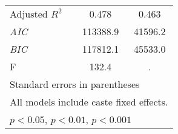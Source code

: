 \begin{table}[htbp]
\begin{tabular}{l*{2}{c}}
Adjusted \(R^{2}\)&    0.478         &    0.463         \\
\textit{AIC}    & 113388.9         &  41596.2         \\
\textit{BIC}    & 117812.1         &  45533.0         \\
F               &    132.4         &        .         \\
\hline\hline
\multicolumn{3}{l}{\footnotesize Standard errors in parentheses}\\
\multicolumn{3}{l}{\footnotesize All models include caste fixed effects.}\\
\multicolumn{3}{l}{\footnotesize \sym{*} \(p<0.05\), \sym{**} \(p<0.01\), \sym{***} \(p<0.001\)}\\
\end{tabular}
\end{table}
